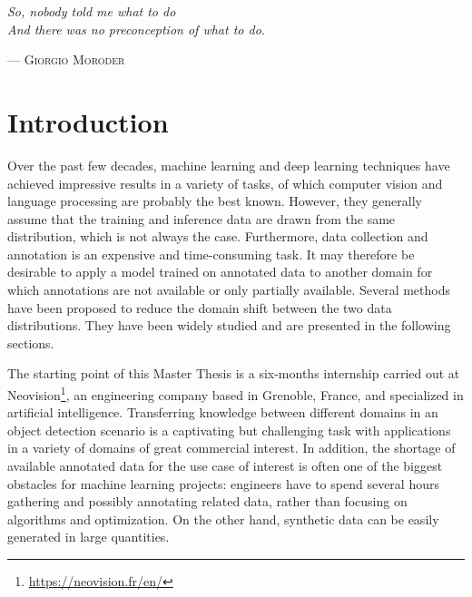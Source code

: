 \documentclass[%
    corpo=12pt,
    twoside,
    stile=classica,   
    tipotesi=magistrale,
    evenboxes,
    english,
	numerazioneromana,
]{toptesi}
\newcommand{\quotes}[1]{``#1''}
\begin{document}

\english

\vspace*{1cm}
\renewcommand{\epigraphsize}{\normalsize}
\setlength{\epigraphwidth}{0.56\textwidth}
\renewcommand{\sourceflush}{flushright}
\let\originalepigraph\epigraph 
\renewcommand\epigraph[2]{\originalepigraph{\textit{#1}}{\textsc{#2}}}
\epigraph{So, nobody told me what to do\\And there was no preconception of what to do.}{--- Giorgio Moroder}

\indici

\mainmatter
\english

\chapter*{Introduction}
Over the past few decades, machine learning and deep learning techniques have achieved impressive results in a variety of tasks, of which computer vision and language processing are probably the best known. However, they generally assume that the training and inference data are drawn from the same distribution, which is not always the case. Furthermore, data collection and annotation is an expensive and time-consuming task. It may therefore be desirable to apply a model trained on annotated data to another domain for which annotations are not available or only partially available. Several methods have been proposed to reduce the domain shift between the two data distributions. They have been widely studied and are presented in the following sections.

\bigskip
The starting point of this Master Thesis is a six-months internship carried out at Neovision\footnote{\url{https://neovision.fr/en/}}, an engineering company based in Grenoble, France, and specialized in artificial intelligence. Transferring knowledge between different domains in an object detection scenario is a captivating but challenging task with applications in a variety of domains of great commercial interest. In addition, the shortage of available annotated data for the use case of interest is often one of the biggest obstacles for machine learning projects: engineers have to spend several hours gathering and possibly annotating related data, rather than focusing on algorithms and optimization. On the other hand, synthetic data can be easily generated in large quantities.
\end{document}
